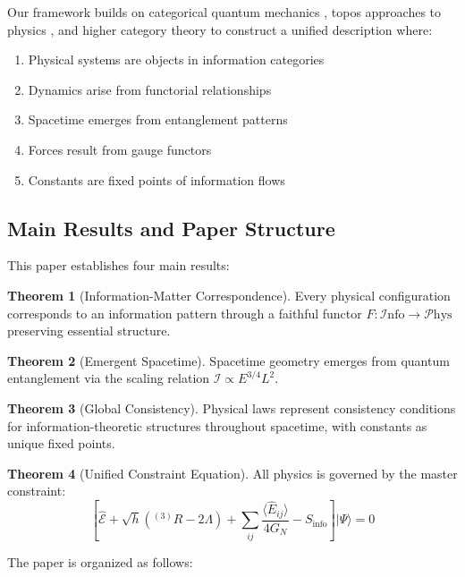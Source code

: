 \documentclass[11pt,a4paper]{article}
\theoremstyle{definition}
\newtheorem{theorem}{Theorem}[section]
\newcommand{\Info}{\mathcal{I}\text{nfo}}
\newcommand{\Phys}{\mathcal{P}\text{hys}}
\begin{document}
Our framework builds on categorical quantum mechanics \cite{Abramsky2004,Coecke2017}, topos approaches to physics \cite{Isham1997,Butterfield2007}, and higher category theory \cite{Baez2010,Lurie2009} to construct a unified description where:

\begin{enumerate}
\item Physical systems are objects in information categories
\item Dynamics arise from functorial relationships
\item Spacetime emerges from entanglement patterns
\item Forces result from gauge functors
\item Constants are fixed points of information flows
\end{enumerate}

\subsection{Main Results and Paper Structure}

This paper establishes four main results:

\begin{theorem}[Information-Matter Correspondence]
Every physical configuration corresponds to an information pattern through a faithful functor $F: \Info \to \Phys$ preserving essential structure.
\end{theorem}

\begin{theorem}[Emergent Spacetime]
Spacetime geometry emerges from quantum entanglement via the scaling relation $\mathcal{I} \propto E^{3/4}L^2$.
\end{theorem}

\begin{theorem}[Global Consistency]
Physical laws represent consistency conditions for information-theoretic structures throughout spacetime, with constants as unique fixed points.
\end{theorem}

\begin{theorem}[Unified Constraint Equation]
All physics is governed by the master constraint:
\[\left[\hat{\mathcal{E}} + \sqrt{h}({}^{(3)}R - 2\Lambda) + \sum_{ij}\frac{\langle\hat{E}_{ij}\rangle}{4G_N} - S_{\text{info}}\right]|\Psi\rangle = 0\]
\end{theorem}

The paper is organized as follows:
\end{document}

